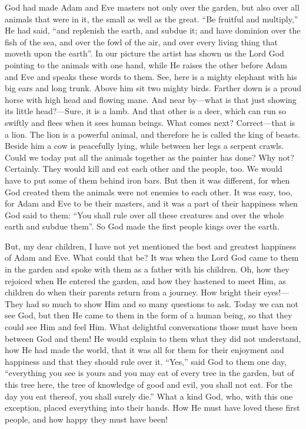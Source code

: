 God had made Adam and Eve masters not only over the garden, but also over all animals that were in it, the small as well as the great. “Be fruitful and multiply,” He had said, “and replenish the earth, and subdue it; and have dominion over the fish of the sea, and over the fowl of the air, and over every living thing that moveth upon the earth”. In our picture the artist has shown us the Lord God pointing to the animals with one hand, while He raises the other before Adam and Eve and speaks these words to them. See, here is a mighty elephant with his big ears and long trunk. Above him sit two mighty birds. Farther down is a proud horse with high head and flowing mane. And near by—what is that just showing its little head?—Sure, it is a lamb. And that other is a deer, which can run so swiftly and flees when it sees human beings. What comes next? Correct—that is a lion. The lion is a powerful animal, and therefore he is called the king of beasts. Beside him a cow is peacefully lying,
while between her legs a serpent crawls. Could we today put all the animals together as the painter has done? Why not? Certainly. They would kill and eat each other and the people, too. We would have to put some of them behind iron bars. But then it was different, for when God created them the animals were not enemies to each other. It was easy, too, for Adam and Eve to be their masters, and it was a part of their happiness when God said to them: “You shall rule over all these creatures and over the whole earth and subdue them”. So God made the first people kings over the earth.

But, my dear children, I have not yet mentioned the best and greatest happiness of Adam and Eve. What could that be? It was when the Lord God came to them in the garden and spoke with them as a father with his children. Oh, how they rejoiced when He entered the garden, and how they hastened to meet Him, as children do when their parents return from a journey. How bright their eyes!—They had so much to show Him and so many questions to ask. Today we can not see God, but then He came to them in the form of a human being, so that they could see Him and feel Him. What delightful conversations those must have been between God and them! He would explain to them what they did not understand, how He had made the world, that it was all for them for their enjoyment and happiness and that they should rule over it. “Yes,” said God to them one day, “everything you see is yours and you may eat of every tree in the garden, but of this tree here, the tree of knowledge of good and evil, you shall not eat. For the day you eat thereof, you shall surely die.” What a kind God, who, with this one exception, placed everything into their hands. How He must have loved these first people, and how happy they must have been!

